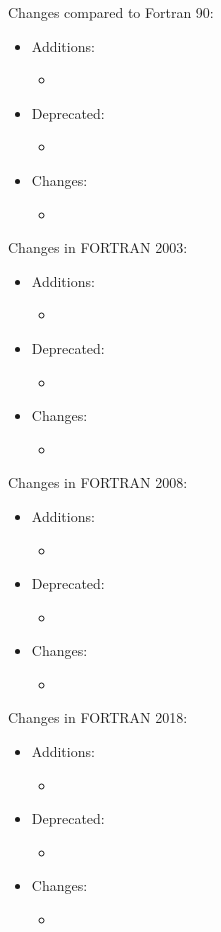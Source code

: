 Changes compared to Fortran 90:
\begin{itemize}
\item Additions:
\begin{itemize}
\item 
\end{itemize}
\item Deprecated:
\begin{itemize}
\item
\end{itemize}
\item Changes:
\begin{itemize}
\item 
\end{itemize}
\end{itemize}
Changes in FORTRAN 2003:
\begin{itemize}
\item Additions:
\begin{itemize}
\item 
\end{itemize}
\item Deprecated:
\begin{itemize}
\item
\end{itemize}
\item Changes:
\begin{itemize}
\item 
\end{itemize}
\end{itemize}
Changes in FORTRAN 2008:
\begin{itemize}
\item Additions:
\begin{itemize}
\item 
\end{itemize}
\item Deprecated:
\begin{itemize}
\item
\end{itemize}
\item Changes:
\begin{itemize}
\item 
\end{itemize}
\end{itemize}
Changes in FORTRAN 2018:
\begin{itemize}
\item Additions:
\begin{itemize}
\item 
\end{itemize}
\item Deprecated:
\begin{itemize}
\item
\end{itemize}
\item Changes:
\begin{itemize}
\item 
\end{itemize}
\end{itemize}